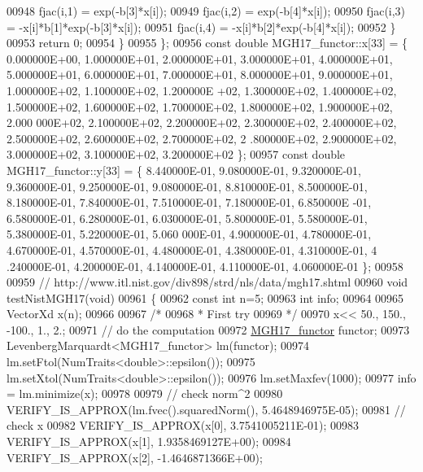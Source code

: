 \begin{DoxyCode}
00948             fjac(i,1) = exp(-b[3]*x[i]);
00949             fjac(i,2) = exp(-b[4]*x[i]);
00950             fjac(i,3) = -x[i]*b[1]*exp(-b[3]*x[i]);
00951             fjac(i,4) = -x[i]*b[2]*exp(-b[4]*x[i]);
00952         \}
00953         \textcolor{keywordflow}{return} 0;
00954     \}
00955 \};
00956 \textcolor{keyword}{const} \textcolor{keywordtype}{double} MGH17\_functor::x[33] = \{ 0.000000E+00, 1.000000E+01, 2.000000E+01, 3.000000E+01, 4.000000E+01,
       5.000000E+01, 6.000000E+01, 7.000000E+01, 8.000000E+01, 9.000000E+01, 1.000000E+02, 1.100000E+02, 1.200000E
      +02, 1.300000E+02, 1.400000E+02, 1.500000E+02, 1.600000E+02, 1.700000E+02, 1.800000E+02, 1.900000E+02, 2.000
      000E+02, 2.100000E+02, 2.200000E+02, 2.300000E+02, 2.400000E+02, 2.500000E+02, 2.600000E+02, 2.700000E+02, 2
      .800000E+02, 2.900000E+02, 3.000000E+02, 3.100000E+02, 3.200000E+02 \};
00957 \textcolor{keyword}{const} \textcolor{keywordtype}{double} MGH17\_functor::y[33] = \{ 8.440000E-01, 9.080000E-01, 9.320000E-01, 9.360000E-01, 9.250000E-01,
       9.080000E-01, 8.810000E-01, 8.500000E-01, 8.180000E-01, 7.840000E-01, 7.510000E-01, 7.180000E-01, 6.850000E
      -01, 6.580000E-01, 6.280000E-01, 6.030000E-01, 5.800000E-01, 5.580000E-01, 5.380000E-01, 5.220000E-01, 5.060
      000E-01, 4.900000E-01, 4.780000E-01, 4.670000E-01, 4.570000E-01, 4.480000E-01, 4.380000E-01, 4.310000E-01, 4
      .240000E-01, 4.200000E-01, 4.140000E-01, 4.110000E-01, 4.060000E-01 \};
00958 
00959 \textcolor{comment}{// http://www.itl.nist.gov/div898/strd/nls/data/mgh17.shtml}
00960 \textcolor{keywordtype}{void} testNistMGH17(\textcolor{keywordtype}{void})
00961 \{
00962   \textcolor{keyword}{const} \textcolor{keywordtype}{int} n=5;
00963   \textcolor{keywordtype}{int} info;
00964 
00965   VectorXd x(n);
00966 
00967   \textcolor{comment}{/*}
00968 \textcolor{comment}{   * First try}
00969 \textcolor{comment}{   */}
00970   x<< 50., 150., -100., 1., 2.;
00971   \textcolor{comment}{// do the computation}
00972   \hyperlink{struct_m_g_h17__functor}{MGH17\_functor} functor;
00973   LevenbergMarquardt<MGH17\_functor> lm(functor);
00974   lm.setFtol(NumTraits<double>::epsilon());
00975   lm.setXtol(NumTraits<double>::epsilon());
00976   lm.setMaxfev(1000);
00977   info = lm.minimize(x);
00978 
00979   \textcolor{comment}{// check norm^2}
00980   VERIFY\_IS\_APPROX(lm.fvec().squaredNorm(), 5.4648946975E-05);
00981   \textcolor{comment}{// check x}
00982   VERIFY\_IS\_APPROX(x[0], 3.7541005211E-01);
00983   VERIFY\_IS\_APPROX(x[1], 1.9358469127E+00);
00984   VERIFY\_IS\_APPROX(x[2], -1.4646871366E+00);

\end{DoxyCode}
